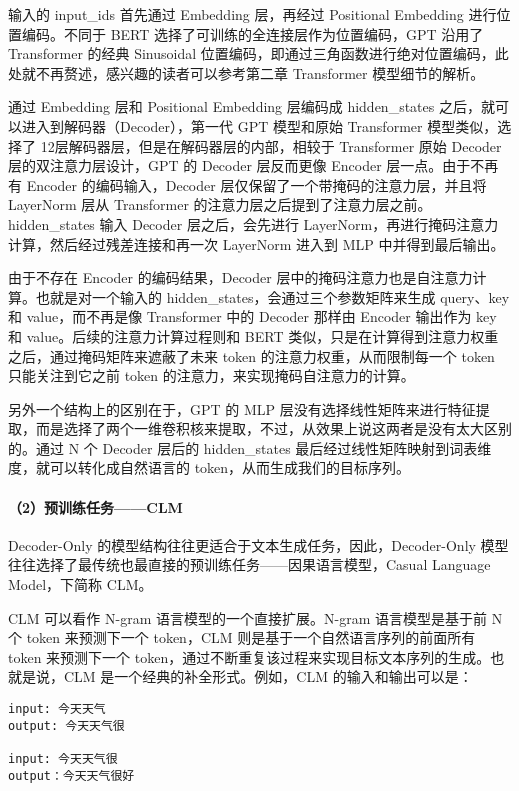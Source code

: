 \documentclass[12pt,a4paper]{book}
\begin{document}
输入的 input\_ids 首先通过 Embedding 层，再经过 Positional Embedding
进行位置编码。不同于 BERT 选择了可训练的全连接层作为位置编码，GPT 沿用了
Transformer 的经典 Sinusoidal
位置编码，即通过三角函数进行绝对位置编码，此处就不再赘述，感兴趣的读者可以参考第二章
Transformer 模型细节的解析。

通过 Embedding 层和 Positional Embedding 层编码成 hidden\_states
之后，就可以进入到解码器（Decoder），第一代 GPT 模型和原始 Transformer
模型类似，选择了 12层解码器层，但是在解码器层的内部，相较于 Transformer
原始 Decoder 层的双注意力层设计，GPT 的 Decoder 层反而更像 Encoder
层一点。由于不再有 Encoder 的编码输入，Decoder
层仅保留了一个带掩码的注意力层，并且将 LayerNorm 层从 Transformer
的注意力层之后提到了注意力层之前。hidden\_states 输入 Decoder
层之后，会先进行
LayerNorm，再进行掩码注意力计算，然后经过残差连接和再一次 LayerNorm
进入到 MLP 中并得到最后输出。

由于不存在 Encoder 的编码结果，Decoder
层中的掩码注意力也是自注意力计算。也就是对一个输入的
hidden\_states，会通过三个参数矩阵来生成 query、key 和 value，而不再是像
Transformer 中的 Decoder 那样由 Encoder 输出作为 key 和
value。后续的注意力计算过程则和 BERT
类似，只是在计算得到注意力权重之后，通过掩码矩阵来遮蔽了未来 token
的注意力权重，从而限制每一个 token 只能关注到它之前 token
的注意力，来实现掩码自注意力的计算。

另外一个结构上的区别在于，GPT 的 MLP
层没有选择线性矩阵来进行特征提取，而是选择了两个一维卷积核来提取，不过，从效果上说这两者是没有太大区别的。通过
N 个 Decoder 层后的 hidden\_states
最后经过线性矩阵映射到词表维度，就可以转化成自然语言的
token，从而生成我们的目标序列。

\paragraph{（2）预训练任务------CLM}\label{ux9884ux8badux7ec3ux4efbux52a1clm}

Decoder-Only 的模型结构往往更适合于文本生成任务，因此，Decoder-Only
模型往往选择了最传统也最直接的预训练任务------因果语言模型，Casual
Language Model，下简称 CLM。

CLM 可以看作 N-gram 语言模型的一个直接扩展。N-gram 语言模型是基于前 N 个
token 来预测下一个 token，CLM 则是基于一个自然语言序列的前面所有 token
来预测下一个
token，通过不断重复该过程来实现目标文本序列的生成。也就是说，CLM
是一个经典的补全形式。例如，CLM 的输入和输出可以是：

\begin{verbatim}
input: 今天天气
output: 今天天气很

input: 今天天气很
output：今天天气很好
\end{verbatim}
\end{document}
